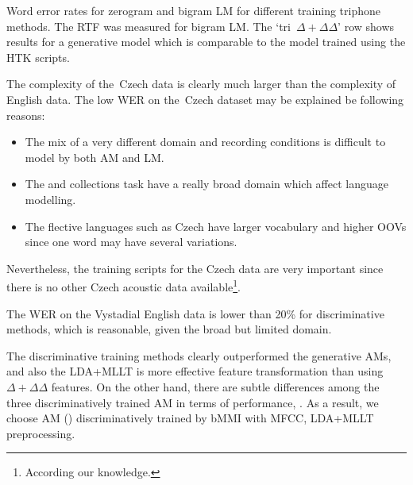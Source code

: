 \begin{table}[h]

\caption{Word error rates for zerogram and bigram LM for different training triphone methods.
    The RTF was measured for bigram \ac{LM}.
    The `tri~$\Delta+\Delta\Delta$' row shows results for a generative model which is comparable to the model trained using the HTK scripts.
}
\label{tab:best}
\end{table}

The complexity of the~Czech data is clearly much larger than the complexity of English data.
The low \ac{WER} on the~Czech dataset may be explained be following reasons:
\begin{itemize}
    \item The mix of a very different domain and recording conditions is difficult to model by both \ac{AM} and \ac{LM}. 
    \item The  and  collections task have a really broad domain which affect language modelling.
    \item The flective languages such as Czech have larger vocabulary and higher \acp{OOV} since one word may have several variations.
\end{itemize}
Nevertheless, the training scripts for the Czech data are very important since there is no other Czech acoustic data available\footnote{According our knowledge.}.

The \ac{WER} on the Vystadial English data is lower than 20\% for discriminative methods, which is reasonable, given the broad but limited domain.

The discriminative training methods clearly outperformed the generative \acp{AM}, and also the \ac{LDA}+\ac{MLLT} is more effective feature transformation than using $\Delta+\Delta\Delta$ features.
On the other hand, there are subtle differences among the three discriminatively trained \ac{AM} in terms of performance, .
As a result, we choose \ac{AM} () discriminatively trained by \ac{bMMI} with \ac{MFCC}, \ac{LDA}+\ac{MLLT} preprocessing. 


